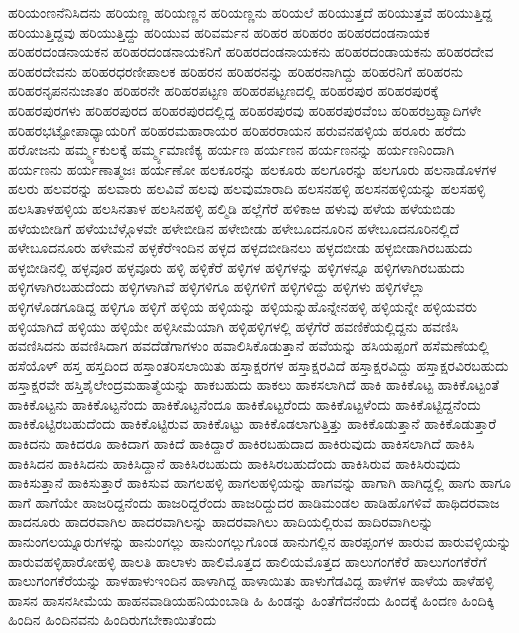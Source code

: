 {ಹರಿಯಂಣನೆನಿಸಿದನು
ಹರಿಯಣ್ಣ
ಹರಿಯಣ್ಣನ
ಹರಿಯಣ್ಣನು
ಹರಿಯಲೆ
ಹರಿಯುತ್ತದೆ
ಹರಿಯುತ್ತವೆ
ಹರಿಯುತ್ತಿದ್ದ
ಹರಿಯುತ್ತಿದ್ದವು
ಹರಿಯುತ್ತಿದ್ದು
ಹರಿಯುವ
ಹರಿವರ್ಮನ
ಹರಿಹರ
ಹರಿಹರಂ
ಹರಿಹರದಂಡನಾಯಕ
ಹರಿಹರದಂಡನಾಯಕನ
ಹರಿಹರದಂಡನಾಯಕನಿಗೆ
ಹರಿಹರದಂಡನಾಯಕನು
ಹರಿಹರದಂಡಾಯಕನು
ಹರಿಹರದೇವ
ಹರಿಹರದೇವನು
ಹರಿಹರಧರಣೀಪಾಲಕ
ಹರಿಹರನ
ಹರಿಹರನನ್ನು
ಹರಿಹರನಾಗಿದ್ದು
ಹರಿಹರನಿಗೆ
ಹರಿಹರನು
ಹರಿಹರನೃಪನನುಜಾತಂ
ಹರಿಹರನೇ
ಹರಿಹರಪಟ್ಟಣ
ಹರಿಹರಪಟ್ಟಣದಲ್ಲಿ
ಹರಿಹರಪುರ
ಹರಿಹರಪುರಕ್ಕೆ
ಹರಿಹರಪುರಗಳು
ಹರಿಹರಪುರದ
ಹರಿಹರಪುರದಲ್ಲಿದ್ದ
ಹರಿಹರಪುರವು
ಹರಿಹರಪುರವೆಂಬ
ಹರಿಹರಬ್ರಹ್ಮಾದಿಗಳೇ
ಹರಿಹರಭಟ್ಟೋಪಾಧ್ಯಾಯರಿಗೆ
ಹರಿಹರಮಹಾರಾಯರ
ಹರಿಹರರಾಯನ
ಹರುವನಹಳ್ಳಿಯ
ಹರೂರು
ಹರೆದು
ಹರೋಜನು
ಹರ್ಮ್ಮ್ಯಕುಲಕ್ಕೆ
ಹರ್ಮ್ಮ್ಯಮಾಣಿಕ್ಯ
ಹರ್ಯಣ
ಹರ್ಯಣನ
ಹರ್ಯಣನನ್ನು
ಹರ್ಯಣನಿಂದಾಗಿ
ಹರ್ಯಣನು
ಹರ್ಯಣಾತ್ಮಜಃ
ಹರ್ಯಣೋ
ಹಲಕೂರನ್ನು
ಹಲಕೂರು
ಹಲಗೂರನ್ನು
ಹಲಗೂರು
ಹಲನಾಡೊಳಗಳ
ಹಲರು
ಹಲವರನ್ನು
ಹಲವಾರು
ಹಲವಿವೆ
ಹಲವು
ಹಲವುಮಾರಾದಿ
ಹಲಸನಹಳ್ಳಿ
ಹಲಸನಹಳ್ಳಿಯನ್ನು
ಹಲಸಹಳ್ಳಿ
ಹಲಸಿತಾಳಹಳ್ಳಿಯ
ಹಲಸಿನತಾಳ
ಹಲಸಿನಹಳ್ಳಿ
ಹಲ್ಮಿಡಿ
ಹಲ್ಲೆಗೆರೆ
ಹಳಿಕಾಱ
ಹಳುವು
ಹಳೆಯ
ಹಳೆಯಬಿಡು
ಹಳೆಯಬೀಡಿಗೆ
ಹಳೆಯಬೆಳ್ಗೊಳವೇ
ಹಳೇಬೀಡಿನ
ಹಳೇಬೀಡು
ಹಳೇಬೂದನೂರಿನ
ಹಳೇಬೂದನೂರಿನಲ್ಲಿದೆ
ಹಳೇಬೂದನೂರು
ಹಳೇಮನೆ
ಹಳ್ಳಕೆರೆಇಂದಿನ
ಹಳ್ಳದ
ಹಳ್ಳದಬೀಡಿನಲು
ಹಳ್ಳದಬೀಡು
ಹಳ್ಳಬೀಡಾಗಿರಬಹುದು
ಹಳ್ಳಬೀಡಿನಲ್ಲಿ
ಹಳ್ಳವೂರ
ಹಳ್ಳವೂರು
ಹಳ್ಳಿ
ಹಳ್ಳಿಕೆರೆ
ಹಳ್ಳಿಗಳ
ಹಳ್ಳಿಗಳನ್ನು
ಹಳ್ಳಿಗಳನ್ನೂ
ಹಳ್ಳಿಗಳಾಗಿರಬಹುದು
ಹಳ್ಳಿಗಳಾಗಿರಬಹುದೆಂದು
ಹಳ್ಳಿಗಳಾಗಿವೆ
ಹಳ್ಳಿಗಳಿಗೂ
ಹಳ್ಳಿಗಳಿಗೆ
ಹಳ್ಳಿಗಳಿದ್ದು
ಹಳ್ಳಿಗಳು
ಹಳ್ಳಿಗಳೆಲ್ಲಾ
ಹಳ್ಳಿಗಳೊಡಗೂಡಿದ್ದ
ಹಳ್ಳಿಗೂ
ಹಳ್ಳಿಗೆ
ಹಳ್ಳಿಯ
ಹಳ್ಳಿಯನ್ನು
ಹಳ್ಳಿಯನ್ನುಹೊನ್ನೇನಹಳ್ಳಿ
ಹಳ್ಳಿಯನ್ನೇ
ಹಳ್ಳಿಯವರು
ಹಳ್ಳಿಯಾಗಿದೆ
ಹಳ್ಳಿಯು
ಹಳ್ಳಿಯೇ
ಹಳ್ಳಿಸೀಮೆಯಾಗಿ
ಹಳ್ಳಿಹಳ್ಳಿಗಳಲ್ಲಿ
ಹಳ್ಳೆಗೆರೆ
ಹವಣಿಕೆಯಲ್ಲಿದ್ದನು
ಹವಣಿಸಿ
ಹವಣಿಸಿದನು
ಹವಣಿಸಿದಾಗ
ಹವದೆಡೆಗಾಗಳುಂ
ಹವಾಲಿಸಿಕೊಡುತ್ತಾನೆ
ಹವೆಯನ್ನು
ಹಸಿಯಪ್ಪಂಗೆ
ಹಸೆಮಣೆಯಲ್ಲಿ
ಹಸೆಯೊಳ್
ಹಸ್ತ
ಹಸ್ತದಿಂದ
ಹಸ್ತಾಂತರಿಸಲಾಯಿತು
ಹಸ್ತಾಕ್ಷರಗಳ
ಹಸ್ತಾಕ್ಷರವಿದೆ
ಹಸ್ತಾಕ್ಷರವಿದ್ದು
ಹಸ್ತಾಕ್ಷರವಿರಬಹುದು
ಹಸ್ತಾಕ್ಷರವೇ
ಹಸ್ತಿಶೈಲೇಂದ್ರಮಹಾತ್ಮೆಯನ್ನು
ಹಾಕಬಹುದು
ಹಾಕಲು
ಹಾಕಸಲಾಗಿದೆ
ಹಾಕಿ
ಹಾಕಿಕೊಟ್ಟ
ಹಾಕಿಕೊಟ್ಟಂತೆ
ಹಾಕಿಕೊಟ್ಟನು
ಹಾಕಿಕೊಟ್ಟನೆಂದು
ಹಾಕಿಕೊಟ್ಟನೆಂದೂ
ಹಾಕಿಕೊಟ್ಟರೆಂದು
ಹಾಕಿಕೊಟ್ಟಳೆಂದು
ಹಾಕಿಕೊಟ್ಟಿದ್ದನೆಂದು
ಹಾಕಿಕೊಟ್ಟಿರಬಹುದೆಂದು
ಹಾಕಿಕೊಟ್ಟಿರುವ
ಹಾಕಿಕೊಟ್ಟು
ಹಾಕಿಕೊಡಲಾಗುತ್ತಿತ್ತು
ಹಾಕಿಕೊಡುತ್ತಾನೆ
ಹಾಕಿಕೊಡುತ್ತಾರೆ
ಹಾಕಿದನು
ಹಾಕಿದರೂ
ಹಾಕಿದಾಗ
ಹಾಕಿದೆ
ಹಾಕಿದ್ದಾರೆ
ಹಾಕಿರಬಹುದಾದ
ಹಾಕಿರುವುದು
ಹಾಕಿಸಲಾಗಿದೆ
ಹಾಕಿಸಿ
ಹಾಕಿಸಿದನ
ಹಾಕಿಸಿದನು
ಹಾಕಿಸಿದ್ದಾನೆ
ಹಾಕಿಸಿರಬಹುದು
ಹಾಕಿಸಿರಬಹುದೆಂದು
ಹಾಕಿಸಿರುವ
ಹಾಕಿಸಿರುವುದು
ಹಾಕಿಸುತ್ತಾನೆ
ಹಾಕಿಸುತ್ತಾರೆ
ಹಾಕಿಸುವ
ಹಾಗಲಹಳ್ಳಿ
ಹಾಗಲಹಳ್ಳಿಯನ್ನು
ಹಾಗವನ್ನು
ಹಾಗಾಗಿ
ಹಾಗಿದ್ದಲ್ಲಿ
ಹಾಗು
ಹಾಗೂ
ಹಾಗೆ
ಹಾಗೆಯೇ
ಹಾಜರಿದ್ದನೆಂದು
ಹಾಜರಿದ್ದರೆಂದು
ಹಾಜರಿದ್ದುದರ
ಹಾಡಿಮಂಡಲ
ಹಾಡಿಹೊಗಳಿವೆ
ಹಾಥಿದರವಾಜ
ಹಾದನೂರು
ಹಾದರವಾಗಿಲ
ಹಾದರವಾಗಿಲನ್ನು
ಹಾದರವಾಗಿಲು
ಹಾದಿಯಲ್ಲಿರುವ
ಹಾದಿರವಾಗಿಲನ್ನು
ಹಾನುಂಗಲಯ್ನೂರುಗಳನ್ನು
ಹಾನುಂಗಲ್ಲು
ಹಾನುಂಗಲ್ಲುಗೊಂಡ
ಹಾನುಗಲ್ಲಿನ
ಹಾರಪ್ಪಂಗಳ
ಹಾರುವ
ಹಾರುವಳ್ಳಿಯನ್ನು
ಹಾರುವಹಳ್ಳಿಹಾರೋಹಳ್ಳಿ
ಹಾಲತಿ
ಹಾಲಾಳು
ಹಾಲಿಮೊತ್ತದ
ಹಾಲಿಯಮೊತ್ತದ
ಹಾಲುಗಂಗಕೆರೆ
ಹಾಲುಗಂಗಕೆರೆಗೆ
ಹಾಲುಗಂಗಕೆರೆಯನ್ನು
ಹಾಳಹಾಳುಇಂದಿನ
ಹಾಳಾಗಿದ್ದ
ಹಾಳಾಯಿತು
ಹಾಳುಗೆಡವಿದ್ದ
ಹಾಳೆಗಳ
ಹಾಳೆಯ
ಹಾಳೆಹಳ್ಳಿ
ಹಾಸನ
ಹಾಸನಸೀಮೆಯ
ಹಾಹನವಾಡಿಯಹನಿಯಂಬಾಡಿ
ಹಿ
ಹಿಂಡನ್ನು
ಹಿಂತೆಗೆದನೆಂದು
ಹಿಂದಕ್ಕೆ
ಹಿಂದಣ
ಹಿಂದಿಕ್ಕಿ
ಹಿಂದಿನ
ಹಿಂದಿನವನು
ಹಿಂದಿರುಗಬೇಕಾಯಿತೆಂದು
}
